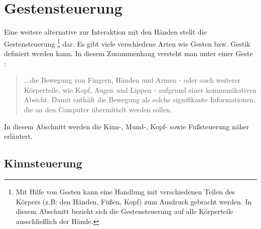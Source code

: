 \section{Gestensteuerung}

Eine weitere alternative zur Interaktion mit den Händen stellt die Gestensteuerung%
\footnote{Mit Hilfe von Gesten kann eine Handlung mit verschiedenen Teilen des Körpers (z.B: den Händen, Füßen, Kopf) zum Ausdruck gebracht werden. In diesem Abschnitt bezieht sich die Gestensteuerung auf alle Körperteile ausschließlich der Hände.} %
dar. Es gibt viele verschiedene Arten wie Gesten bzw. Gestik definiert werden kann. In diesem Zusammenhang versteht man unter einer Geste \cite{PreimDachselt}:
\begin{quote} ...die Bewegung von Fingern, Händen und Armen - oder auch weiterer Körperteile, wie Kopf, Augen und Lippen - aufgrund einer kommunikativen Absicht. Damit enthält die Bewegung als solche signifikante Informationen, die an den Computer übermittelt werden sollen. \end{quote}
In diesem Abschnitt werden die Kinn-, Mund-, Kopf- sowie Fußsteuerung näher erläutert. 


\subsection{Kinnsteuerung}
\label{cha:Kinnsteuerung}

